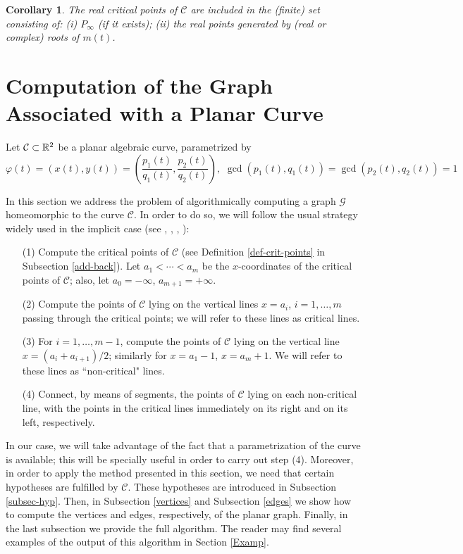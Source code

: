 \documentclass{elsart}
\newtheorem{corollary}[theorem]{{\bf Corollary}}
\begin{document}
\begin{corollary} \label{gen-critical}
The real critical points of ${\mathcal C}$ are included in the (finite) set consisting of: (i) $P_{\infty}$ (if it exists); (ii) the real points generated by (real or complex) roots of $m(t)$.
\end{corollary}


\section{Computation of the Graph Associated with a Planar Curve} \label{plane-case}

Let ${\mathcal C}\subset {\Bbb R}^2$ be a planar algebraic curve,
parametrized by
\[\varphi(t)=(x(t),y(t))=\left(\displaystyle{\frac{p_1(t)}{q_1(t)}},\displaystyle{\frac{p_2(t)}{q_2(t)}}\right), \,\,  \gcd(p_1(t), q_1(t))=\gcd(p_2(t), q_2(t))=1 \]

In this section we address the problem of algorithmically
computing a graph ${\mathcal G}$ homeomorphic to the curve
${\mathcal C}$. In order to do so, we will follow the usual
strategy widely used in the implicit case (see \cite{Eigen},
\cite{Lalo}, \cite{Hong}, \cite{seidel}):
\begin{itemize}
\item [(1)] Compute the critical points of ${\mathcal C}$
(see Definition \ref{def-crit-points} in Subsection \ref{add-back}). Let $a_1<\cdots<a_m$ be the $x$-coordinates of
the critical points of ${\mathcal C}$; also, let $a_0=-\infty$, $a_{m+1}=+\infty$.
 \item [(2)] Compute the points of ${\mathcal C}$ lying on the
 vertical lines $x=a_i$, $i=1,\ldots,m$ passing through the critical points;
 we will refer to these lines as {\sf critical lines}.
 \item [(3)] For $i=1,\ldots,m-1$, compute the points of ${\mathcal C}$ lying on the vertical line $x=(a_i+a_{i+1})/2$; similarly for $x=a_1-1$, $x=a_m+1$. We will refer to these lines as ``non-critical" lines.
 \item [(4)] Connect, by means of segments, the points of ${\mathcal C}$ lying on each non-critical line, with the points in the critical lines immediately
 on its right and on its left, respectively.
     \end{itemize}

In our case, we will take advantage of the fact that a parametrization of the curve is available; this will be specially useful in order to carry out step (4). Moreover, in order to apply the method presented in this section, we need that certain hypotheses are fulfilled by ${\mathcal C}$. These hypotheses are introduced in Subsection \ref{subsec-hyp}. Then, in Subsection \ref{vertices} and Subsection \ref{edges} we show how to compute the vertices and edges, respectively, of the planar graph. Finally, in the last subsection we provide the full algorithm. The reader may find
several examples of the output of this algorithm in Section \ref{Examp}.
\end{document}
